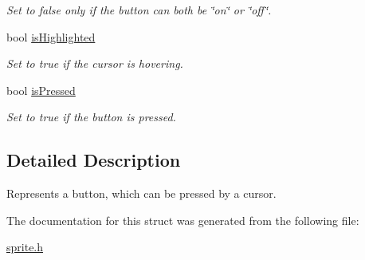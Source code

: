 \begin{DoxyCompactItemize}
\begin{DoxyCompactList}\small\item\em Set to false only if the button can both be \char`\"{}on\char`\"{} or \char`\"{}off\char`\"{}. \end{DoxyCompactList}\item 
bool \mbox{\hyperlink{group__sprite_ga0d0eccfb33156acc548e70e09bfbf69b}{is\+Highlighted}}
\begin{DoxyCompactList}\small\item\em Set to true if the cursor is hovering. \end{DoxyCompactList}\item 
bool \mbox{\hyperlink{group__sprite_gaf40951436602ca874e5a7bc90774a71b}{is\+Pressed}}
\begin{DoxyCompactList}\small\item\em Set to true if the button is pressed. \end{DoxyCompactList}\end{DoxyCompactItemize}


\subsection{Detailed Description}
Represents a button, which can be pressed by a cursor. 

The documentation for this struct was generated from the following file\+:\begin{DoxyCompactItemize}
\item 
\mbox{\hyperlink{sprite_8h}{sprite.\+h}}\end{DoxyCompactItemize}

